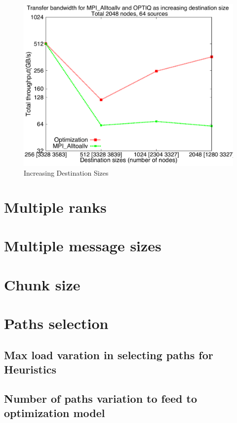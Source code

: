 \documentclass[letter]{article}
\begin{document}
\begin{figure}[h]
\vspace{-0.1in}
\centering
\includegraphics[scale=0.40]{report_figures/incrsize/incrsize_4k.pdf}
\vspace{-0.1in}
\caption{Increasing Destination Sizes}
\vspace{-0.1in}
\label{fig:incrsize_4k}
\end{figure}

\clearpage
\newpage






\clearpage
\newpage

\section{Multiple ranks}

\section{Multiple message sizes}

\section{Chunk size}

\section{Paths selection}

\subsection{Max load varation in selecting paths for Heuristics}

\subsection{Number of paths variation to feed to optimization model}
\end{document}
